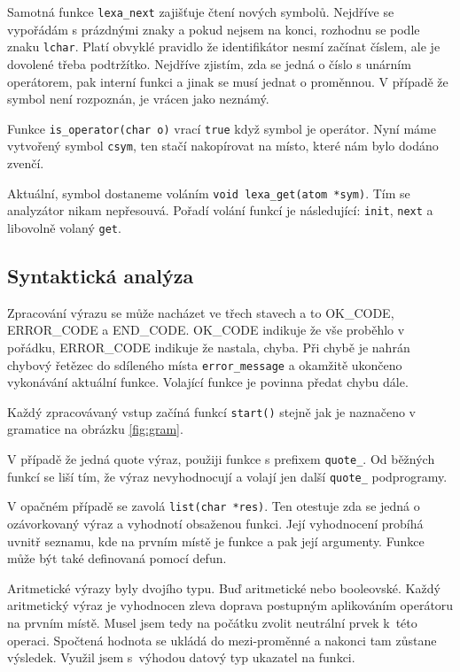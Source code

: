 \documentclass[a4paper, 12pt]{article}
\begin{document}
Samotná funkce \texttt{lexa\_next} zajišťuje čtení nových symbolů.
Nejdříve se vypořádám s prázdnými znaky a pokud nejsem na konci,
rozhodnu se podle znaku \texttt{lchar}. Platí obvyklé pravidlo
že identifikátor nesmí začínat číslem, ale je dovolené třeba podtržítko.
Nejdříve zjistím, zda se jedná o číslo s unárním operátorem, pak
interní funkci a jinak se musí jednat o proměnnou. V případě
že symbol není rozpoznán, je vrácen jako neznámý.

Funkce \texttt{is\_operator(char o)} vrací \texttt{true} když
symbol je operátor. Nyní máme vytvořený symbol \texttt{csym}, ten
stačí nakopírovat na místo, které nám bylo dodáno zvenčí.

Aktuální, symbol dostaneme voláním
\verb+void lexa_get(atom *sym)+. Tím se analyzátor nikam nepřesouvá.
Pořadí volání funkcí je následující: \texttt{init}, \texttt{next} a
libovolně volaný \texttt{get}.

\subsection{Syntaktická analýza}
Zpracování výrazu se může nacházet ve třech stavech a to OK\_CODE,
ERROR\_CODE a END\_CODE. OK\_CODE indikuje že vše proběhlo v pořádku,
ERROR\_CODE indikuje že nastala, chyba. Při chybě je nahrán chybový
řetězec do sdíleného místa \texttt{error\_message} a okamžitě ukončeno
vykonávání aktuální funkce. Volající funkce je povinna předat chybu dále.

Každý zpracovávaný vstup začíná funkcí \texttt{start()} stejně jak
je naznačeno v gramatice na obrázku \ref{fig:gram}.

V případě že jedná quote výraz, použiji funkce s prefixem
\texttt{quote\_}. Od běžných funkcí se liší tím, že výraz nevyhodnocují
a volají jen další \texttt{quote\_} podprogramy.

V opačném případě se zavolá \texttt{list(char *res)}. Ten otestuje
zda se jedná o ozávorkovaný výraz a vyhodnotí obsaženou funkci.
Její vyhodnocení probíhá uvnitř seznamu, kde na prvním místě je
funkce a pak její argumenty. Funkce může být také definovaná pomocí
\textsf{defun}.

Aritmetické výrazy byly dvojího typu. Buď aritmetické nebo
booleovské. Každý aritmetický výraz je vyhodnocen zleva doprava
postupným aplikováním operátoru na prvním místě. Musel jsem tedy na
počátku zvolit neutrální prvek k~této operaci. Spočtená hodnota se
ukládá do mezi-proměnné a nakonci tam zůstane výsledek. Využil jsem
s~výhodou datový typ ukazatel na funkci.
\end{document}
